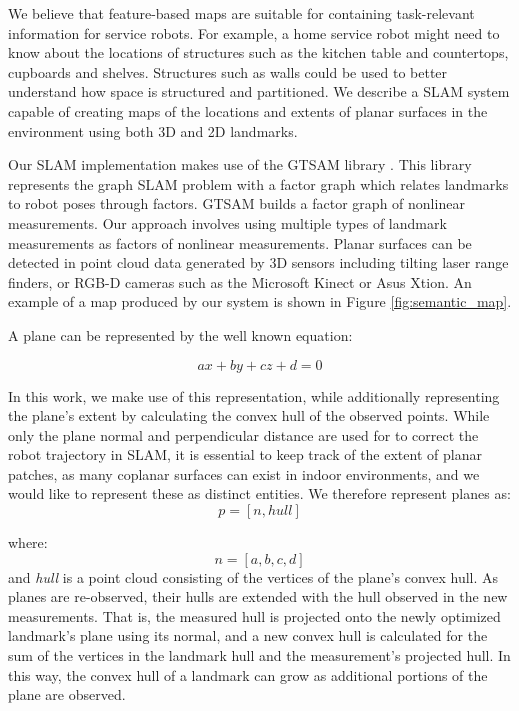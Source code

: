 \documentclass{tADR2e}
\begin{document}
We believe that feature-based maps are suitable for containing task-relevant information for service robots. For example, a home service robot might need to know
about the locations of structures such as the kitchen table and countertops, cupboards and shelves. Structures such as walls could be used to better understand how space is
structured and partitioned. We describe a SLAM system capable of creating maps of
the locations and extents of planar surfaces in the environment using both 3D and 2D landmarks.

Our SLAM implementation makes use of the GTSAM library \cite{dellaert2006square}. This library
represents the graph SLAM problem with a factor graph which relates landmarks to
robot poses through factors. GTSAM builds a factor graph of nonlinear measurements. Our approach involves using multiple types of landmark measurements as factors of nonlinear measurements. Planar surfaces can be detected in point cloud data generated by 3D sensors including tilting laser range finders, or RGB-D cameras such as the Microsoft Kinect or Asus Xtion. An example of a map produced
by our system is shown in Figure \ref{fig:semantic_map}.

A plane can be represented by the well known equation:

\begin{equation}
ax + by + cz + d = 0
\end{equation}

In this work, we make use of this representation, while additionally representing
the plane’s extent by calculating the convex hull of the observed points. While only
the plane normal and perpendicular distance are used for to correct the robot trajectory in SLAM, it is essential to keep track of the extent of planar patches, as many
coplanar surfaces can exist in indoor environments, and we would like to represent
these as distinct entities. We therefore represent planes as:
\begin{equation}
p = [n, hull]
\end{equation}

where:
\begin{equation}
n = [a, b, c, d]
\end{equation}
and \textit{hull} is a point cloud consisting of the vertices of the plane’s convex hull. As
planes are re-observed, their hulls are extended with the hull observed in the new
measurements. That is, the measured hull is projected onto the newly optimized
landmark’s plane using its normal, and a new convex hull is calculated for the sum
of the vertices in the landmark hull and the measurement’s projected hull. In this
way, the convex hull of a landmark can grow as additional portions of the plane are
observed.
\end{document}
